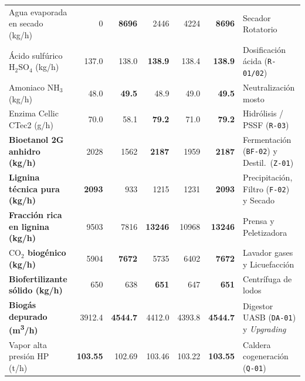 \documentclass{report}
\begin{document}
\begin{table}[H]
{\begin{tabular}{l r r r r | r l}
            Agua evaporada en secado (\si{\kilo\gram/\hour}) & \num{0}               & \textbf{\num{8696}}  & \num{2446}             & \num{4224}           & \textbf{\num{8696}}                  & Secador Rotatorio \\
            Ácido sulfúrico $\mathrm{H_2SO_4}$ (\si{\kilo\gram/\hour}) & \num{137.0} & \num{138.0}        & \textbf{\num{138.9}}   & \num{138.4}          & \textbf{\num{138.9}}                 & Dosificación ácida (\texttt{R-01/02}) \\
            Amoniaco $\mathrm{NH_3}$ (\si{\kilo\gram/\hour}) & \num{48.0}            & \textbf{\num{49.5}}  & \num{48.9}             & \num{49.0}           & \textbf{\num{49.5}}                  & Neutralización mosto              \\
            Enzima Cellic CTec2 (\si{\gram/\hour})      & \num{70.0}            & \num{58.1}           & \textbf{\num{79.2}}    & \num{71.0}           & \textbf{\num{79.2}}                  & Hidrólisis / PSSF (\texttt{R-03}) \\
            \midrule
            \textbf{Bioetanol 2G anhidro (\si{\kilo\gram/\hour})} & \num{2028}        & \num{1562}           & \textbf{\num{2187}}    & \num{1959}           & \textbf{\num{2187}}                  & Fermentación (\texttt{BF-02}) y Destil.\ (\texttt{Z-01}) \\
            \textbf{Lignina técnica pura (\si{\kilo\gram/\hour})} & \textbf{\num{2093}} & \num{933}          & \num{1215}             & \num{1231}           & \textbf{\num{2093}}                  & Precipitación, Filtro (\texttt{F-02}) y Secado \\
            \textbf{Fracción rica en lignina (\si{\kilo\gram/\hour})} & \num{9503}    & \num{7816}           & \textbf{\num{13246}}   & \num{10968}          & \textbf{\num{13246}}                 & Prensa y Peletizadora             \\
            \textbf{$\text{CO}_2$ biogénico (\si{\kilo\gram/\hour})} & \num{5904}     & \textbf{\num{7672}}  & \num{5735}             & \num{6402}           & \textbf{\num{7672}}                  & Lavador gases y Licuefacción      \\
            \textbf{Biofertilizante sólido (\si{\kilo\gram/\hour})} & \num{650}       & \num{638}            & \textbf{\num{651}}     & \num{647}            & \textbf{\num{651}}                   & Centrífuga de lodos               \\
            \textbf{Biogás depurado (\si{\cubic\meter/\hour})} & \num{3912.4}         & \textbf{\num{4544.7}}& \num{4412.0}           & \num{4393.8}         & \textbf{\num{4544.7}}                & Digestor UASB (\texttt{DA-01}) y \textit{Upgrading} \\
            Vapor alta presión HP (\si{\tonne/\hour})   & \textbf{\num{103.55}} & \num{102.69}         & \num{103.46}           & \num{103.22}         & \textbf{\num{103.55}}                & Caldera cogeneración (\texttt{Q-01}) \\
            \bottomrule
        \end{tabular}%
    }
    \label{tab:caudales_horarios_dimensionamiento}
\end{table}
\end{document}
